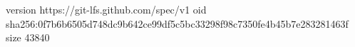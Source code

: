 version https://git-lfs.github.com/spec/v1
oid sha256:0f7b6b6505d748dc9b642ce99df5c5bc33298f98c7350fe4b45b7e283281463f
size 43840
